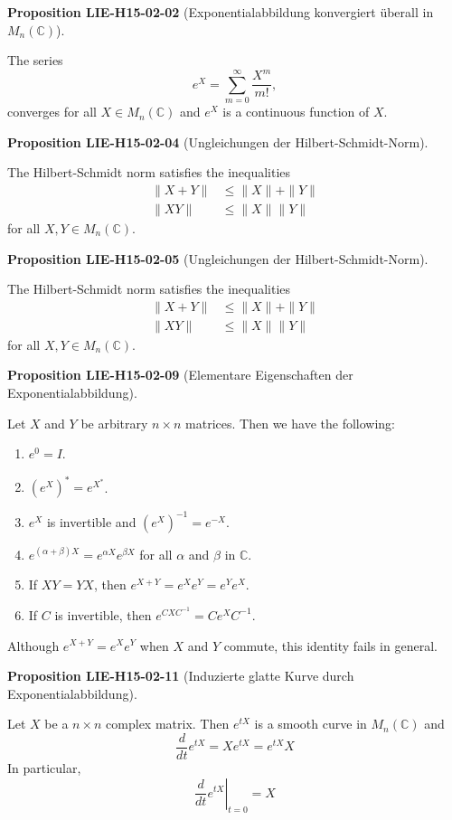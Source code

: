 \documentclass[10pt, letterpaper]{article}
\newcommand{\C}{\mathbb{C}}
\newcommand{\CustomHeading}[3]{%
  \par\medskip\noindent%
  \textbf{#1 #2} \textnormal{(#3)}.\enskip%
}
\newenvironment{PROP}[2]{\CustomHeading{Proposition}{#1}{#2}}{}
\begin{document}
\begin{PROP}{LIE-H15-02-02}{Exponentialabbildung konvergiert überall in $M_n(\C)$}
The series 
$$
e^{X}=\sum_{m=0}^{\infty} \frac{X^{m}}{m!},
$$
converges for all $X \in M_{n}(\mathbb{C})$ and $e^{X}$ is a continuous function of $X$.
\end{PROP}

\begin{PROP}{LIE-H15-02-04}{Ungleichungen der Hilbert-Schmidt-Norm}
The Hilbert-Schmidt norm satisfies the inequalities
$$
\begin{aligned}
\|X+Y\| & \leq\|X\|+\|Y\| \\
\|X Y\| & \leq\|X\|\|Y\|
\end{aligned}
$$
for all $X, Y \in M_{n}(\mathbb{C})$.
\end{PROP}

\begin{PROP}{LIE-H15-02-05}{Ungleichungen der Hilbert-Schmidt-Norm}
The Hilbert-Schmidt norm satisfies the inequalities
$$
\begin{aligned}
\|X+Y\| & \leq\|X\|+\|Y\| \\
\|X Y\| & \leq\|X\|\|Y\|
\end{aligned}
$$
for all $X, Y \in M_{n}(\mathbb{C})$.
\end{PROP}

\begin{PROP}{LIE-H15-02-09}{Elementare Eigenschaften der Exponentialabbildung}
Let $X$ and $Y$ be arbitrary $n \times n$ matrices. Then we have the following:
\begin{enumerate}
  \item $e^{0}=I$.
  \item $\left(e^{X}\right)^{*}=e^{X^{*}}$.
  \item $e^{X}$ is invertible and $\left(e^{X}\right)^{-1}=e^{-X}$.
  \item $e^{(\alpha+\beta) X}=e^{\alpha X} e^{\beta X}$ for all $\alpha$ and $\beta$ in $\mathbb{C}$.
  \item If $X Y=Y X$, then $e^{X+Y}=e^{X} e^{Y}=e^{Y} e^{X}$.
  \item If $C$ is invertible, then $e^{C X C^{-1}}=C e^{X} C^{-1}$.
\end{enumerate}
Although $e^{X+Y}=e^{X} e^{Y}$ when $X$ and $Y$ commute, this identity fails in general.
\end{PROP}

\begin{PROP}{LIE-H15-02-11}{Induzierte glatte Kurve durch Exponentialabbildung}
Let $X$ be a $n \times n$ complex matrix. Then $e^{t X}$ is a smooth curve in $M_{n}(\mathbb{C})$ and
$$
\frac{d}{d t} e^{t X}=X e^{t X}=e^{t X} X
$$
In particular,
$$
\left.\frac{d}{d t} e^{t X}\right|_{t=0}=X
$$
\end{PROP}
\end{document}
